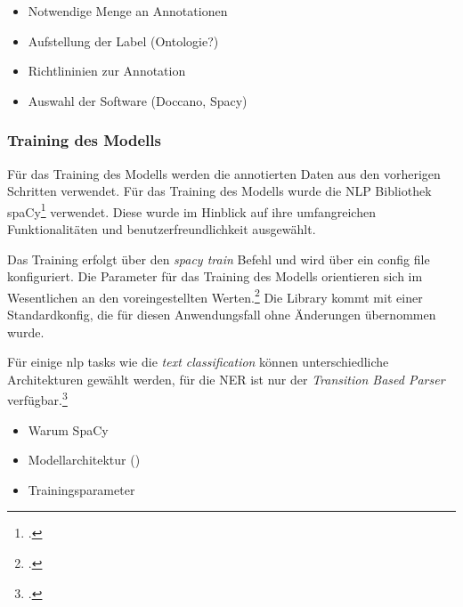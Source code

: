 
\begin{itemize}
    \item Notwendige Menge an Annotationen
    \item Aufstellung der Label (Ontologie?)
    \item Richtlininien zur Annotation
    \item Auswahl der Software (Doccano, Spacy)
\end{itemize}
\subsubsection{Training des Modells}
Für das Training des Modells werden die annotierten Daten aus den vorherigen Schritten verwendet.
Für das Training des Modells wurde die \acl*{NLP} Bibliothek spaCy\footcite[]{spacy2} verwendet. Diese wurde im Hinblick auf ihre umfangreichen Funktionalitäten und benutzerfreundlichkeit ausgewählt.

Das Training erfolgt über den \textit{spacy train} Befehl und wird über ein config file konfiguriert. Die Parameter für das Training des Modells orientieren sich im Wesentlichen an den voreingestellten Werten.\footcite[vgl.]{ostkamp2021} Die Library kommt mit einer Standardkonfig, die für diesen Anwendungsfall ohne Änderungen übernommen wurde.

Für einige \ac*{nlp} tasks wie die \textit{text classification} können unterschiedliche Architekturen gewählt werden, für die \acl*{NER} ist nur der \textit{Transition Based Parser} verfügbar.\footcite{zotero-182}

\begin{itemize}
    \item Warum SpaCy
    \item Modellarchitektur ()
    \item Trainingsparameter
\end{itemize}


